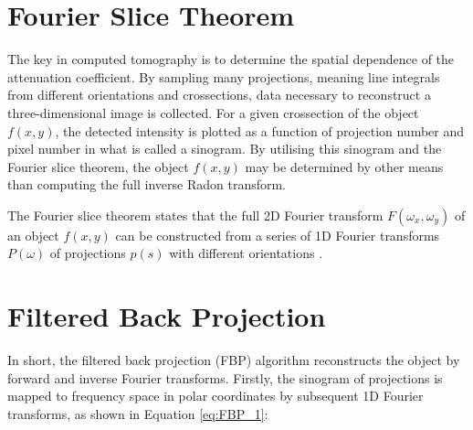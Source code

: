 
\section{Fourier Slice Theorem}
The key in computed tomography is to determine the spatial dependence of the attenuation coefficient. By sampling many projections, meaning line integrals from different orientations and crossections, data necessary to reconstruct a three-dimensional image is collected. For a given crossection of the object $f(x,y)$, the detected intensity is plotted as a function of projection number and pixel number in what is called a sinogram. By utilising this sinogram and the Fourier slice theorem, the object $f(x,y)$ may be determined by other means than computing the full inverse Radon transform.


The Fourier slice theorem states that the full 2D Fourier transform $F(\omega_x, \omega_y)$ of an object $f(x,y)$ can be constructed from a series of 1D Fourier transforms $P(\omega)$ of projections $p(s)$ with different orientations \cite{zeng2010medical}. 




\section{Filtered Back Projection}
In short, the filtered back projection (FBP) algorithm reconstructs the object by forward and inverse Fourier transforms. Firstly, the sinogram of projections is mapped to frequency space in polar coordinates by subsequent 1D Fourier transforms, as shown in Equation \eqref{eq:FBP_1}:

